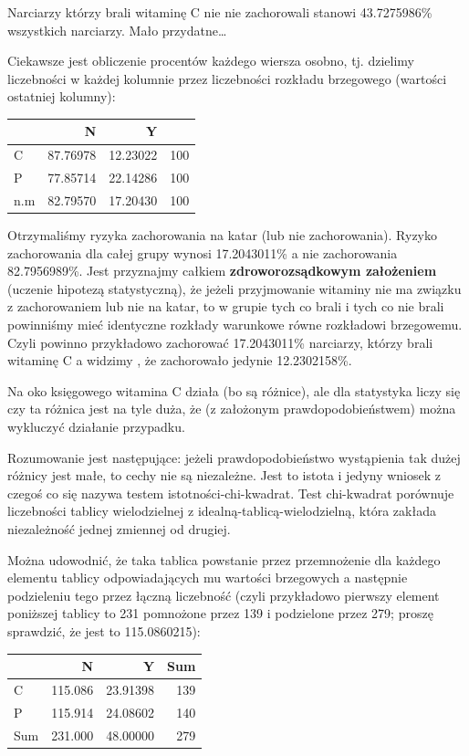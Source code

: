 \documentclass[
  openany]{book}
\begin{document}
\begin{example}
Narciarzy którzy brali witaminę C nie nie zachorowali stanowi 43.7275986\%
wszystkich narciarzy. Mało przydatne\ldots{}

Ciekawsze jest obliczenie procentów każdego wiersza osobno, tj. dzielimy
liczebności w każdej kolumnie przez liczebności rozkładu brzegowego (wartości
ostatniej kolumny):

\begin{tabular}{l|r|r|r}
\hline
  & N & Y & \\
\hline
C & 87.76978 & 12.23022 & 100\\
\hline
P & 77.85714 & 22.14286 & 100\\
\hline
n.m & 82.79570 & 17.20430 & 100\\
\hline
\end{tabular}

Otrzymaliśmy ryzyka zachorowania na katar (lub nie zachorowania). Ryzyko
zachorowania dla całej grupy wynosi 17.2043011\% a nie zachorowania
82.7956989\%. Jest przyznajmy całkiem \textbf{zdroworozsądkowym założeniem}
(uczenie hipotezą statystyczną), że jeżeli przyjmowanie witaminy nie ma związku
z zachorowaniem lub nie na katar, to w grupie tych co brali i tych co nie brali
powinniśmy mieć identyczne rozkłady warunkowe równe rozkładowi brzegowemu.
Czyli powinno przykładowo zachorować 17.2043011\% narciarzy, którzy
brali witaminę C a widzimy , że zachorowało jedynie 12.2302158\%.

Na oko księgowego witamina C działa (bo są różnice), ale dla statystyka liczy się
czy ta różnica jest na tyle duża, że (z założonym prawdopodobieństwem)
można wykluczyć działanie przypadku.

Rozumowanie jest następujące: jeżeli prawdopodobieństwo wystąpienia
tak dużej różnicy jest małe, to cechy nie są niezależne.
Jest to istota i jedyny wniosek z czegoś co się nazywa
testem istotności-chi-kwadrat.
Test chi-kwadrat porównuje liczebności tablicy wielodzielnej z idealną-tablicą-wielodzielną, która zakłada niezależność jednej zmiennej od drugiej.

Można udowodnić, że taka tablica powstanie przez przemnożenie dla
każdego elementu tablicy odpowiadających mu wartości brzegowych
a następnie podzieleniu tego przez łączną liczebność (czyli przykładowo pierwszy
element poniższej tablicy to 231 pomnożone przez
139 i podzielone przez 279; proszę
sprawdzić,
że jest to 115.0860215):

\begin{tabular}{l|r|r|r}
\hline
  & N & Y & Sum\\
\hline
C & 115.086 & 23.91398 & 139\\
\hline
P & 115.914 & 24.08602 & 140\\
\hline
Sum & 231.000 & 48.00000 & 279\\
\hline
\end{tabular}


\end{example}
\end{document}
